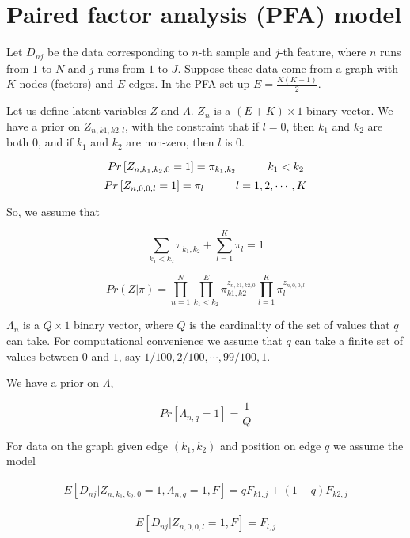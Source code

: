 \documentclass[12pt]{article}
\begin{document}
\section{Paired factor analysis (PFA) model}

Let $D_{nj}$ be the data corresponding to $n$-th sample and $j$-th feature, 
where $n$ runs from $1$ to $N$ and $j$ runs from $1$ to $J$.  
Suppose these data come from a graph with $K$ nodes (factors) and $E$ edges. In the
PFA set up $E=\frac{K(K-1)}{2}$.

Let us define latent variables $Z$ and $\Lambda$. $Z_{n}$ is a $(E+K)
\times 1$ binary vector. We have a prior on $Z_{n,k1,k2,l}$, with the constraint that if $l=0$, then $k_1$ and $k_2$ are both $0$, and if $k_1$ and $k_2$ are non-zero, then $l$ is 0.

$$ Pr \left [ Z_{n, k_1, k_2, 0} = 1 \right ] = \pi_{k_1,k_2} \hspace{1 cm} k_1 < k_2$$
$$ Pr \left [ Z_{n, 0, 0, l} = 1 \right ] = \pi_{l} \hspace{1 cm} l=1,2, \cdots, K$$

So, we assume that 

$$ \sum_{k_1 < k_2} \pi_{k_1,k_2} + \sum_{l=1}^{K} \pi_{l} = 1 $$

$$  Pr (Z |  \pi )  = \prod_{n=1}^{N} \prod_{k_1 < k_2}^E \pi_{k1,k2}^{z_{n,k1,k2,0}} \prod_{l=1}^{K} \pi_{l}^{z_{n,0,0,l}} $$

$\Lambda_{n}$ is a $Q \times 1$ binary vector, where $Q$ is the cardinality of the set of values that $q$ can take.
For computational convenience we assume that $q$ can take a finite set of values between $0$ and $1$, 
say $1/100, 2/100, \cdots, 99/100, 1$.

We have a prior on  $\Lambda$,


$$ Pr \left [ \Lambda_{n, q} = 1 \right ] = \frac{1}{Q}  $$


For data on the graph given edge $(k_1, k_2)$ and position on edge $q$ we assume the model 

\begin{eqnarray}
 E \left [ D_{nj} | Z_{n, k_1, k_2, 0} = 1, \Lambda_{n,q}=1, F \right] = q F_{k1,j} + (1-q) F_{k2,j}
\end{eqnarray}

\begin{eqnarray}
 E \left [ D_{nj} | Z_{n, 0, 0, l} = 1, F \right] =  F_{l,j} 
\end{eqnarray}
\end{document}
